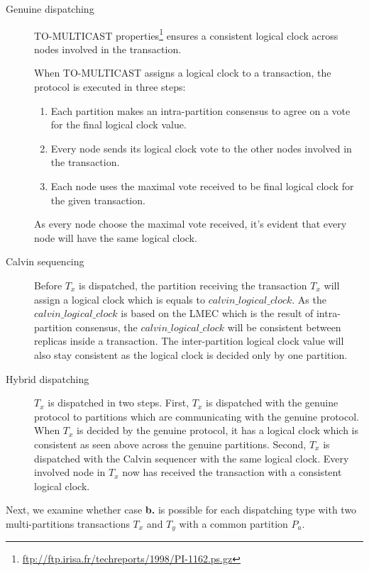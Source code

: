 \documentclass[a4paper, 10pt]{article}
\begin{document}
\begin{description}
    \item[Genuine dispatching] TO-MULTICAST properties\footnote{\url{ftp://ftp.irisa.fr/techreports/1998/PI-1162.ps.gz}}
        ensures a consistent logical clock across nodes involved in the transaction.

        When TO-MULTICAST assigns a logical clock to a transaction, the protocol is executed in three steps:
        \begin{enumerate}
            \item Each partition makes an intra-partition consensus to agree on a vote
                for the final logical clock value.
            \item Every node sends its logical clock vote to the other nodes involved in the transaction.
            \item Each node uses the maximal vote received to be final logical clock
                for the given transaction.
        \end{enumerate}
        As every node choose the maximal vote received, it's evident that every node will have the
        same logical clock.

    \item[Calvin sequencing] Before $T_x$ is dispatched, the partition receiving the transaction $T_x$ will assign
        a logical clock which is equals to $calvin\_logical\_clock$. As the $calvin\_logical\_clock$ is
        based on the LMEC which is the result of intra-partition consensus, the $calvin\_logical\_clock$ will
        be consistent between replicas inside a transaction. The inter-partition logical clock value will also stay
        consistent as the logical clock is decided only by one partition.

    \item[Hybrid dispatching] $T_x$ is dispatched in two steps. First, $T_x$ is dispatched with
        the genuine protocol to partitions which are communicating with the genuine protocol.
        When $T_x$ is decided by the genuine protocol, it has a logical clock which is consistent as seen above
        across the genuine partitions. Second, $T_x$ is dispatched with the Calvin sequencer with the same logical
        clock. Every involved node in $T_x$ now has received the transaction with a consistent logical clock.
\end{description}

Next, we examine whether case \textbf{b.} is possible for each dispatching type with two multi-partitions
transactions $T_x$ and $T_y$ with a common partition $P_a$.
\end{document}
